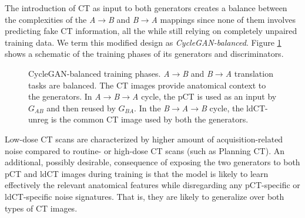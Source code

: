 \vspace{4mm}
The introduction of CT as input to both generators creates a balance between the complexities of the \textit{A}$\rightarrow$\textit{B} and \textit{B}$\rightarrow$\textit{A} mappings since none of them involves predicting fake CT information, all the while still relying on completely unpaired training data. We term this modified design as \textit{CycleGAN-balanced}. Figure \ref{fig:cyclegan_balanced} shows a schematic of the training phases of its generators and discriminators.

\begin{figure}[h!]
    \centering
    \caption{CycleGAN-balanced training phases. \textit{A}$\rightarrow$\textit{B} and \textit{B}$\rightarrow$\textit{A} translation tasks are balanced. The CT images provide anatomical context to the generators. In \textit{A}$\rightarrow$\textit{B}$\rightarrow$\textit{A} cycle, the pCT is used as an input by $G_{AB}$ and then reused by $G_{BA}$. In the \textit{B}$\rightarrow$\textit{A}$\rightarrow$\textit{B} cycle, the ldCT-unreg is the common CT image used by both the generators.}
    \label{fig:cyclegan_balanced}
\end{figure}{}

Low-dose CT scans are characterized by higher amount of acquisition-related noise compared to routine- or high-dose CT scans (such as Planning CT). An additional, possibly desirable, consequence of exposing the two generators to both pCT and ldCT images during training is that the model is likely to learn effectively the relevant anatomical features while disregarding any pCT-specific or ldCT-specific noise signatures. That is, they are likely to generalize over both types of CT images.


